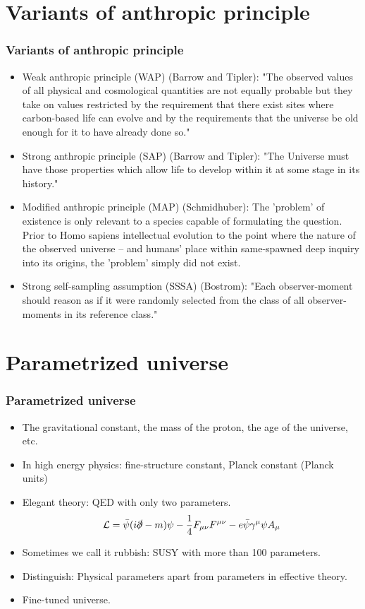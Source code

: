 \documentclass[8pt]{beamer}
\begin{document}
\section{Variants of anthropic principle}
\begin{frame}
  \frametitle{Variants of anthropic principle}
  \begin{itemize}
    \item Weak anthropic principle (WAP) (Barrow and Tipler): "The observed values of all physical and cosmological quantities are not equally probable but they take on values restricted by the requirement that there exist sites where carbon-based life can evolve and by the requirements that the universe be old enough for it to have already done so."
    \item Strong anthropic principle (SAP) (Barrow and Tipler): "The Universe must have those properties which allow life to develop within it at some stage in its history."
    \item Modified anthropic principle (MAP) (Schmidhuber): The 'problem' of existence is only relevant to a species capable of formulating the question. Prior to Homo sapiens intellectual evolution to the point where the nature of the observed universe -- and humans' place within same-spawned deep inquiry into its origins, the 'problem' simply did not exist.
    \item Strong self-sampling assumption (SSSA) (Bostrom): "Each observer-moment should reason as if it were randomly selected from the class of all observer-moments in its reference class."
  \end{itemize}
\end{frame}

\section{Parametrized universe}
\begin{frame}
  \frametitle{Parametrized universe}
  \begin{itemize}
    \item The gravitational constant, the mass of the proton, the age of the universe, etc.
    \item In high energy physics: fine-structure constant, Planck constant (Planck units)
    \item Elegant theory: QED with only two parameters.
    $$\mathcal{L}=\bar\psi(i\slashed \partial-m)\psi-\frac{1}{4}F_{\mu\nu}F^{\mu\nu}-e\bar\psi\gamma^{\mu}\psi A_{\mu}$$
    \item Sometimes we call it rubbish: SUSY with more than 100 parameters.
    \item Distinguish: Physical parameters apart from parameters in effective theory.
    \item Fine-tuned universe.
  \end{itemize}
\end{frame}
\end{document}
